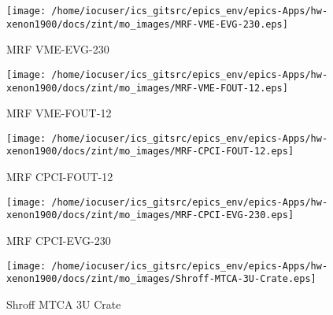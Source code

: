 \noindent
\vspace{1.4cm}
\begin{minipage}{.2\textwidth}
\begin{center}
\texttt{[image: /home/iocuser/ics\_gitsrc/epics\_env/epics-Apps/hw-xenon1900/docs/zint/mo\_images/MRF-VME-EVG-230.eps]}
\end{center}
\end{minipage}
\begin{minipage}{.7\textwidth}
MRF VME-EVG-230
\end{minipage}


\noindent
\vspace{1.4cm}
\begin{minipage}{.2\textwidth}
\begin{center}
\texttt{[image: /home/iocuser/ics\_gitsrc/epics\_env/epics-Apps/hw-xenon1900/docs/zint/mo\_images/MRF-VME-FOUT-12.eps]}
\end{center}
\end{minipage}
\begin{minipage}{.7\textwidth}
MRF VME-FOUT-12
\end{minipage}


\noindent
\vspace{1.4cm}
\begin{minipage}{.2\textwidth}
\begin{center}
\texttt{[image: /home/iocuser/ics\_gitsrc/epics\_env/epics-Apps/hw-xenon1900/docs/zint/mo\_images/MRF-CPCI-FOUT-12.eps]}
\end{center}
\end{minipage}
\begin{minipage}{.7\textwidth}
MRF CPCI-FOUT-12
\end{minipage}


\noindent
\vspace{1.4cm}
\begin{minipage}{.2\textwidth}
\begin{center}
\texttt{[image: /home/iocuser/ics\_gitsrc/epics\_env/epics-Apps/hw-xenon1900/docs/zint/mo\_images/MRF-CPCI-EVG-230.eps]}
\end{center}
\end{minipage}
\begin{minipage}{.7\textwidth}
MRF CPCI-EVG-230
\end{minipage}


\noindent
\vspace{1.4cm}
\begin{minipage}{.2\textwidth}
\begin{center}
\texttt{[image: /home/iocuser/ics\_gitsrc/epics\_env/epics-Apps/hw-xenon1900/docs/zint/mo\_images/Shroff-MTCA-3U-Crate.eps]}
\end{center}
\end{minipage}
\begin{minipage}{.7\textwidth}
Shroff MTCA 3U Crate
\end{minipage}


